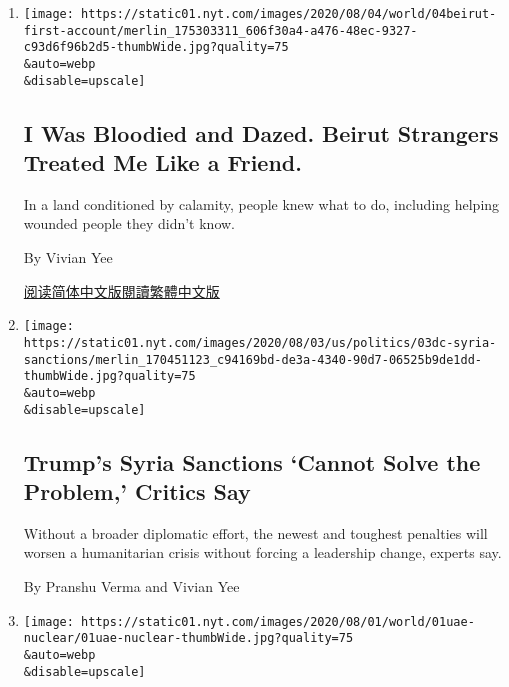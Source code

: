\begin{enumerate}
\def\labelenumi{\arabic{enumi}.}
\item
  \href{/2020/08/04/world/middleeast/lebanon-explosion-beirut.html}{}

  \texttt{[image: https://static01.nyt.com/images/2020/08/04/world/04beirut-first-account/merlin\_175303311\_606f30a4-a476-48ec-9327-c93d6f96b2d5-thumbWide.jpg?quality=75\\\&auto=webp\\\&disable=upscale]}

  \hypertarget{i-was-bloodied-and-dazed-beirut-strangers-treated-me-like-a-friend}{%
  \subsection{I Was Bloodied and Dazed. Beirut Strangers Treated Me Like
  a
  Friend.}\label{i-was-bloodied-and-dazed-beirut-strangers-treated-me-like-a-friend}}

  In a land conditioned by calamity, people knew what to do, including
  helping wounded people they didn't know.

  By Vivian Yee

  \href{https://cn.nytimes.com/world/20200805/beirut-explosion-first-person/}{阅读简体中文版}\href{https://cn.nytimes.com/world/20200805/beirut-explosion-first-person/zh-hant/}{閱讀繁體中文版}
\item
  \href{/2020/08/04/world/middleeast/trump-assad-syria-sanctions.html}{}

  \texttt{[image: https://static01.nyt.com/images/2020/08/03/us/politics/03dc-syria-sanctions/merlin\_170451123\_c94169bd-de3a-4340-90d7-06525b9de1dd-thumbWide.jpg?quality=75\\\&auto=webp\\\&disable=upscale]}

  \hypertarget{trumps-syria-sanctions-cannot-solve-the-problem-critics-say}{%
  \subsection{Trump's Syria Sanctions `Cannot Solve the Problem,'
  Critics
  Say}\label{trumps-syria-sanctions-cannot-solve-the-problem-critics-say}}

  Without a broader diplomatic effort, the newest and toughest penalties
  will worsen a humanitarian crisis without forcing a leadership change,
  experts say.

  By Pranshu Verma and Vivian Yee
\item
  \href{/2020/08/01/world/middleeast/uae-nuclear-Barakah.html}{}

  \texttt{[image: https://static01.nyt.com/images/2020/08/01/world/01uae-nuclear/01uae-nuclear-thumbWide.jpg?quality=75\\\&auto=webp\\\&disable=upscale]}


\end{enumerate}
